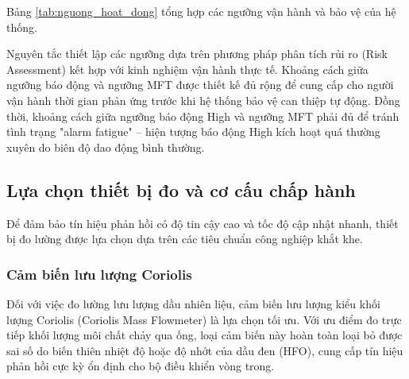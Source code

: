 \documentclass[../main.tex]{subfiles}
\begin{document}
Bảng \ref{tab:nguong_hoat_dong} tổng hợp các ngưỡng vận hành và bảo vệ của hệ thống.

\begin{table}[htbp]
\centering
\caption{Các ngưỡng vận hành và bảo vệ của hệ thống}
\label{tab:nguong_hoat_dong}
\end{table}

Nguyên tắc thiết lập các ngưỡng dựa trên phương pháp phân tích rủi ro (Risk Assessment) kết hợp với kinh nghiệm vận hành thực tế. Khoảng cách giữa ngưỡng báo động và ngưỡng MFT được thiết kế đủ rộng để cung cấp cho người vận hành thời gian phản ứng trước khi hệ thống bảo vệ can thiệp tự động. Đồng thời, khoảng cách giữa ngưỡng báo động High và ngưỡng MFT phải đủ để tránh tình trạng "alarm fatigue" -- hiện tượng báo động High kích hoạt quá thường xuyên do biên độ dao động bình thường.

\subsection{Lựa chọn thiết bị đo và cơ cấu chấp hành}

Để đảm bảo tín hiệu phản hồi có độ tin cậy cao và tốc độ cập nhật nhanh, thiết bị đo lường được lựa chọn dựa trên các tiêu chuẩn công nghiệp khắt khe.

\subsubsection{Cảm biến lưu lượng Coriolis}

Đối với việc đo lường lưu lượng dầu nhiên liệu, cảm biến lưu lượng kiểu khối lượng Coriolis (Coriolis Mass Flowmeter) là lựa chọn tối ưu. Với ưu điểm đo trực tiếp khối lượng môi chất chảy qua ống, loại cảm biến này hoàn toàn loại bỏ được sai số do biến thiên nhiệt độ hoặc độ nhớt của dầu đen (HFO), cung cấp tín hiệu phản hồi cực kỳ ổn định cho bộ điều khiển vòng trong.
\end{document}

